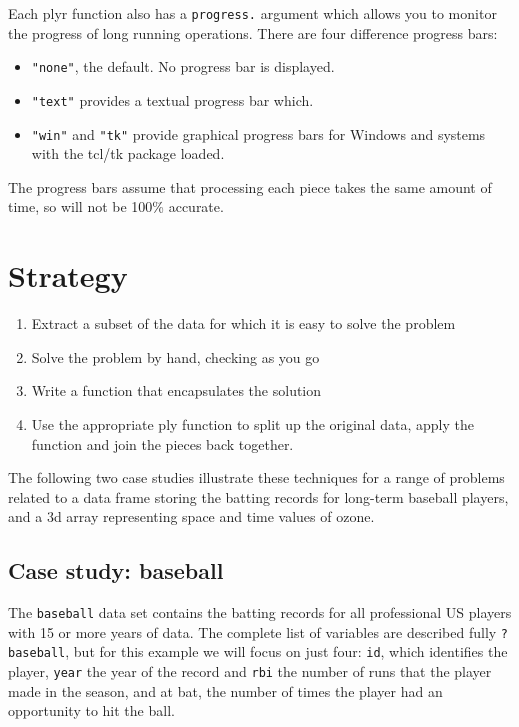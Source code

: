\documentclass{scrartcl}
\begin{document}
Each plyr function also has a {\tt progress.} argument which allows you to monitor the progress of long running operations.  There are four difference progress bars:

\begin{itemize}
  \item {\tt "none"}, the default.  No progress bar is displayed.
  \item {\tt "text"} provides a textual progress bar which.
  \item {\tt "win"} and {\tt "tk"} provide graphical progress bars for Windows and systems with the tcl/tk package loaded.
\end{itemize}

The progress bars assume that processing each piece takes the same amount of time, so will not be 100\% accurate.

\section{Strategy}
\label{sec:strategy}



\begin{enumerate}
  \item Extract a subset of the data for which it is easy to solve the problem
  \item Solve the problem by hand, checking as you go
  \item Write a function that encapsulates the solution
  \item Use the appropriate ply function to split up the original data, apply the function and join the pieces back together.
  
\end{enumerate}

The following two case studies illustrate these techniques for a range of problems related to a data frame storing the batting records for long-term baseball players, and a 3d array representing space and time values of ozone.

\subsection{Case study: baseball}

The {\tt baseball} data set contains the batting records for all professional US players with 15 or more years of data.  The complete list of variables are described fully {\tt ?baseball}, but for this example we will focus on just four: {\tt id}, which identifies the player, {\tt year} the year of the record and {\tt rbi} the number of runs that the player made in the season, and {\tt} at bat, the number of times the player had an opportunity to hit the ball.
\end{document}
